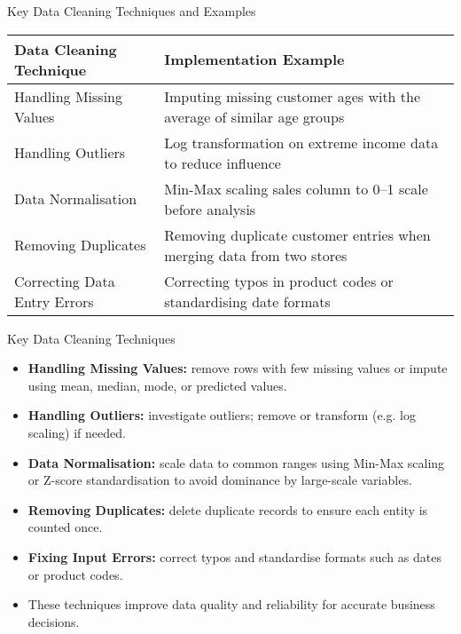 \documentclass[aspectratio=169, table]{beamer}
\begin{document}
\begin{frame}{Key Data Cleaning Techniques and Examples}
	\vspace{20pt}
	\centering
	\renewcommand{\arraystretch}{1.2}
	\begin{tabular}{|p{}|p{}|}
		\hline
		\textbf{Data Cleaning Technique} & \textbf{Implementation Example} \\
		\hline
		Handling Missing Values & Imputing missing customer ages with the average of similar age groups \\
		\hline
		Handling Outliers & Log transformation on extreme income data to reduce influence \\
		\hline
		Data Normalisation & Min-Max scaling sales column to 0–1 scale before analysis \\
		\hline
		Removing Duplicates & Removing duplicate customer entries when merging data from two stores \\
		\hline
		Correcting Data Entry Errors & Correcting typos in product codes or standardising date formats \\
		\hline
	\end{tabular}
\end{frame}

\begin{frame}{Key Data Cleaning Techniques}
	\vspace{20pt}
	
	\begin{itemize}
		\item \textbf{Handling Missing Values:} remove rows with few missing values or impute using mean, median, mode, or predicted values.
		
		\item \textbf{Handling Outliers:} investigate outliers; remove or transform (e.g. log scaling) if needed.
		
		\item \textbf{Data Normalisation:} scale data to common ranges using Min-Max scaling or Z-score standardisation to avoid dominance by large-scale variables.
		
		\item \textbf{Removing Duplicates:} delete duplicate records to ensure each entity is counted once.
		
		\item \textbf{Fixing Input Errors:} correct typos and standardise formats such as dates or product codes.
		
		\item These techniques improve data quality and reliability for accurate business decisions.
	\end{itemize}
	
\end{frame}
\end{document}
